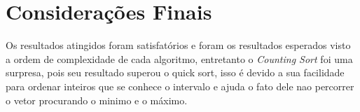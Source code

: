 \documentclass[a4paper, 10pt]{article}
\begin{document}
\section{Considerações Finais}
Os resultados atingidos foram satisfatórios e foram os resultados esperados visto a ordem de complexidade de cada algoritmo, entretanto o \textit{Counting Sort} foi uma surpresa, pois seu resultado superou o quick sort, isso é devido a sua facilidade para ordenar inteiros que se conhece o intervalo e ajuda o fato dele nao percorrer o vetor procurando o minimo e o máximo.
\end{document}
